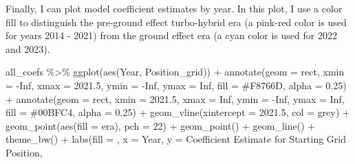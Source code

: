 \documentclass[
]{book}
\newenvironment{Shaded}{\begin{snugshade}}{\end{snugshade}}
\newcommand{\AttributeTok}[1]{\textcolor[rgb]{0.77,0.63,0.00}{#1}}
\newcommand{\ConstantTok}[1]{\textcolor[rgb]{0.00,0.00,0.00}{#1}}
\newcommand{\DecValTok}[1]{\textcolor[rgb]{0.00,0.00,0.81}{#1}}
\newcommand{\FloatTok}[1]{\textcolor[rgb]{0.00,0.00,0.81}{#1}}
\newcommand{\FunctionTok}[1]{\textcolor[rgb]{0.00,0.00,0.00}{#1}}
\newcommand{\NormalTok}[1]{#1}
\newcommand{\SpecialCharTok}[1]{\textcolor[rgb]{0.00,0.00,0.00}{#1}}
\newcommand{\StringTok}[1]{\textcolor[rgb]{0.31,0.60,0.02}{#1}}
\begin{document}
Finally, I can plot model coefficient estimates by year. In this plot, I use a color fill to distinguish the pre-ground effect turbo-hybrid era (a pink-red color is used for years 2014 - 2021) from the ground effect era (a cyan color is used for 2022 and 2023).

\begin{Shaded}
\begin{Highlighting}[]
\NormalTok{all\_coefs }\SpecialCharTok{\%\textgreater{}\%}
  \FunctionTok{ggplot}\NormalTok{(}\FunctionTok{aes}\NormalTok{(Year, Position\_grid)) }\SpecialCharTok{+}
  \FunctionTok{annotate}\NormalTok{(}\AttributeTok{geom =} \StringTok{\textquotesingle{}rect\textquotesingle{}}\NormalTok{, }
           \AttributeTok{xmin =} \SpecialCharTok{{-}}\ConstantTok{Inf}\NormalTok{, }\AttributeTok{xmax =} \FloatTok{2021.5}\NormalTok{,}
           \AttributeTok{ymin =} \SpecialCharTok{{-}}\ConstantTok{Inf}\NormalTok{, }\AttributeTok{ymax =} \ConstantTok{Inf}\NormalTok{,}
           \AttributeTok{fill =} \StringTok{\textquotesingle{}\#F8766D\textquotesingle{}}\NormalTok{,}
           \AttributeTok{alpha =} \FloatTok{0.25}\NormalTok{) }\SpecialCharTok{+} 
  \FunctionTok{annotate}\NormalTok{(}\AttributeTok{geom =} \StringTok{\textquotesingle{}rect\textquotesingle{}}\NormalTok{, }
           \AttributeTok{xmin =} \FloatTok{2021.5}\NormalTok{, }\AttributeTok{xmax =} \ConstantTok{Inf}\NormalTok{,}
           \AttributeTok{ymin =} \SpecialCharTok{{-}}\ConstantTok{Inf}\NormalTok{, }\AttributeTok{ymax =} \ConstantTok{Inf}\NormalTok{,}
           \AttributeTok{fill =} \StringTok{\textquotesingle{}\#00BFC4\textquotesingle{}}\NormalTok{,}
           \AttributeTok{alpha =} \FloatTok{0.25}\NormalTok{) }\SpecialCharTok{+} 
  \FunctionTok{geom\_vline}\NormalTok{(}\AttributeTok{xintercept =} \FloatTok{2021.5}\NormalTok{, }\AttributeTok{col =} \StringTok{\textquotesingle{}grey\textquotesingle{}}\NormalTok{) }\SpecialCharTok{+} 
  \FunctionTok{geom\_point}\NormalTok{(}\FunctionTok{aes}\NormalTok{(}\AttributeTok{fill =}\NormalTok{ era), }\AttributeTok{pch =} \DecValTok{22}\NormalTok{) }\SpecialCharTok{+}
  \FunctionTok{geom\_point}\NormalTok{() }\SpecialCharTok{+}
  \FunctionTok{geom\_line}\NormalTok{() }\SpecialCharTok{+}
  \FunctionTok{theme\_bw}\NormalTok{() }\SpecialCharTok{+}
  \FunctionTok{labs}\NormalTok{(}\AttributeTok{fill =} \StringTok{\textquotesingle{}\textquotesingle{}}\NormalTok{,}
       \AttributeTok{x =} \StringTok{\textquotesingle{}Year\textquotesingle{}}\NormalTok{, }\AttributeTok{y =} \StringTok{\textquotesingle{}Coefficient Estimate for Starting Grid Position\textquotesingle{}}\NormalTok{,}

\end{Highlighting}
\end{Shaded}
\end{document}
